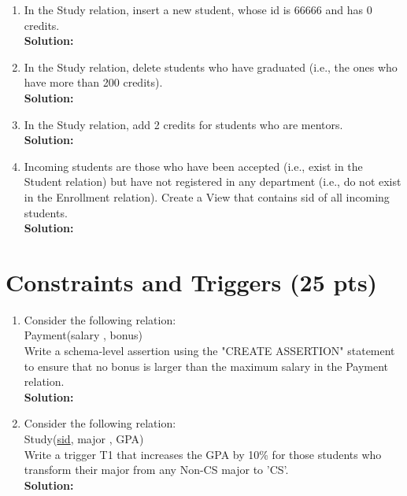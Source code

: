 \documentclass[paper=a4, fontsize=11pt]{scrartcl}
\numberwithin{equation}{section}		%
\numberwithin{figure}{section}			%
\numberwithin{table}{section}				%
\begin{document}
\begin{enumerate}
\item In the Study relation, insert a new student, whose id is 66666 and has 0 credits.\\
\textbf{Solution: }


\item In the Study relation, delete students who have graduated (i.e., the ones who have more than 200 credits).\\
\textbf{Solution: }


\item In the Study relation, add 2 credits for students who are mentors.\\
\textbf{Solution: }


\item Incoming students are those who have been accepted (i.e., exist in the Student relation) but have not registered in any department (i.e., do not exist in the Enrollment relation). Create a View that contains sid of all incoming students.\\
\textbf{Solution: }

\end{enumerate}







\section{Constraints and Triggers (25 pts)}
\begin{enumerate}
\item Consider the following relation: \\
Payment(salary , bonus) \\
Write a schema-level assertion using the "CREATE ASSERTION" statement to ensure that no bonus is larger than the maximum salary in the Payment relation.\\
\textbf{Solution: }


\item Consider the following relation: \\
Study(\underline{sid}, major , GPA) \\
Write a trigger T1 that increases the GPA by 10\% for those students who transform their major from any Non-CS major to 'CS'.\\
\textbf{Solution: }


\end{enumerate}





\end{document}

